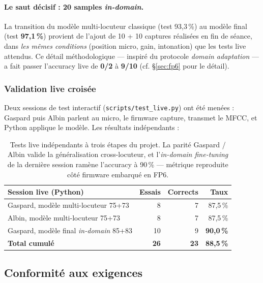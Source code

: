 \paragraph{Le saut décisif : 20 samples \emph{in-domain}.}
La transition du modèle multi-locuteur classique (test 93{,}3\,\%) au modèle final (test \textbf{97{,}1\,\%}) provient de l'ajout de 10 + 10 captures réalisées en fin de séance, dans \emph{les mêmes conditions} (position micro, gain, intonation) que les tests live attendus. Ce détail méthodologique --- inspiré du protocole \emph{domain adaptation} --- a fait passer l'accuracy live de \textbf{0/2} à \textbf{9/10} (cf. §\ref{sec:fp6} pour le détail).

\subsubsection{Validation live croisée}

Deux sessions de test interactif (\texttt{scripts/test\_live.py}) ont été menées : Gaspard puis Albin parlent au micro, le firmware capture, transmet le MFCC, et Python applique le modèle. Les résultats indépendants :

\begin{table}[H]
\centering
\small
\begin{tabularx}{0.85\linewidth}{@{}l r r r@{}}
\toprule
\textbf{Session live (Python)} & \textbf{Essais} & \textbf{Corrects} & \textbf{Taux} \\
\midrule
Gaspard, modèle multi-locuteur 75+73   & 8 & 7 & 87{,}5\,\% \\
Albin, modèle multi-locuteur 75+73     & 8 & 7 & 87{,}5\,\% \\
Gaspard, modèle final \emph{in-domain} 85+83 & 10 & 9 & \textbf{90{,}0\,\%} \\
\midrule
\textbf{Total cumulé}                  & \textbf{26} & \textbf{23} & \textbf{88{,}5\,\%} \\
\bottomrule
\end{tabularx}
\caption{Tests live indépendants à trois étapes du projet. La parité Gaspard / Albin valide la généralisation cross-locuteur, et l'\emph{in-domain fine-tuning} de la dernière session ramène l'accuracy à 90\,\% --- métrique reproduite côté firmware embarqué en FP6.}
\label{tab:fp5-live}
\end{table}

\subsection{Conformité aux exigences}

